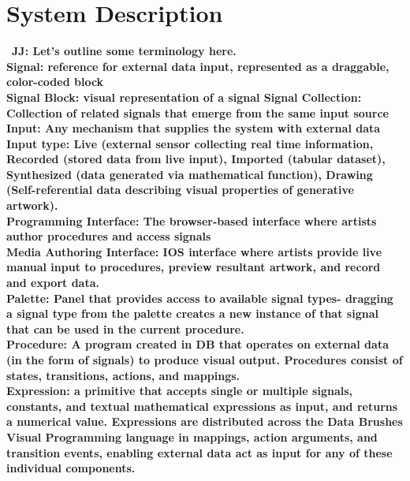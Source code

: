 \documentclass{sigchi}
\newcommand {\jen}[1]{{\color{teal}\bf{JJ: #1}\normalfont}}
\begin{document}
\section{System Description}
~\jen{Let's outline some terminology here.\\
Signal: reference for external data input, represented as a draggable, color-coded block\\
Signal Block: visual representation of a signal
Signal Collection: Collection of related signals that emerge from the same input source\\
Input: Any mechanism that supplies the system with external data \\
Input type: Live (external sensor collecting real time information, Recorded (stored data from live input), Imported (tabular dataset), Synthesized (data generated via mathematical function), Drawing (Self-referential data describing visual properties of generative artwork).\\
Programming Interface: The browser-based interface where artists author procedures and access signals\\
Media Authoring Interface: IOS interface where artists provide live manual input to procedures, preview resultant artwork, and record and export data.\\
Palette: Panel that provides access to available signal types- dragging a signal type from the palette creates a new instance of that signal that can be used in the current procedure.\\
Procedure: A program created in DB that operates on external data (in the form of signals) to produce visual output. Procedures consist of states, transitions, actions, and mappings.\\
Expression: a primitive that accepts single or multiple signals, constants, and textual mathematical expressions as input, and returns a numerical value. Expressions are distributed across the Data Brushes Visual Programming language in mappings, action arguments, and transition events, enabling external data act as input for any of these individual components.
}
\end{document}
